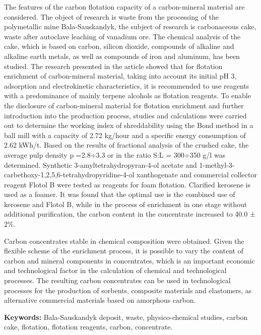 The features of the carbon flotation capacity of a carbon-mineral
material are considered. The object of research is waste from the
processing of the polymetallic mine Bala-Sauskandyk, the subject of
research is carbonaceous cake, waste after autoclave leaching of
vanadium ore. The chemical analysis of the cake, which is based on
carbon, silicon dioxide, compounds of alkaline and alkaline earth
metals, as well as compounds of iron and aluminum, has been studied. The
research presented in the article showed that for flotation enrichment
of carbon-mineral material, taking into account its initial pH 3,
adsorption and electrokinetic characteristics, it is recommended to use
reagents with a predominance of mainly terpene alcohols as flotation
reagents. To enable the disclosure of carbon-mineral material for
flotation enrichment and further introduction into the production
process, studies and calculations were carried out to determine the
working index of shreddability using the Bond method in a ball mill with
a capacity of 2.72 kg/hour and a specific energy consumption of 2.62
kWh/t. Based on the results of fractional analysis of the crushed cake,
the average pulp density p =2.8÷3.3 or in the ratio S:L = 300÷350 g/l
was determined. Synthetic 3-amyltetrahydropyran-4-ol acetate and
1-methyl-3-carbethoxy-1,2,5,6-tetrahydropyridine-4-ol xanthogenate and
commercial collector reagent Flotol B were tested as reagents for foam
flotation. Clarified kerosene is used as a foamer. It was found that the
optimal use is the combined use of kerosene and Flotol B, while in the
process of enrichment in one stage without additional purification, the
carbon content in the concentrate increased to 40.0 ± 2\%.

Carbon concentrates stable in chemical composition were obtained. Given
the flexible scheme of the enrichment process, it is possible to vary
the content of carbon and mineral components in concentrates, which is
an important economic and technological factor in the calculation of
chemical and technological processes. The resulting carbon concentrates
can be used in technological processes for the production of sorbents,
composite materials and elastomers, as alternative commercial materials
based on amorphous carbon.

{\bfseries Keywords:} Bala-Sauskandyk deposit, waste, physico-chemical
studies, carbon cake, flotation, flotation reagents, carbon,
concentrate.

